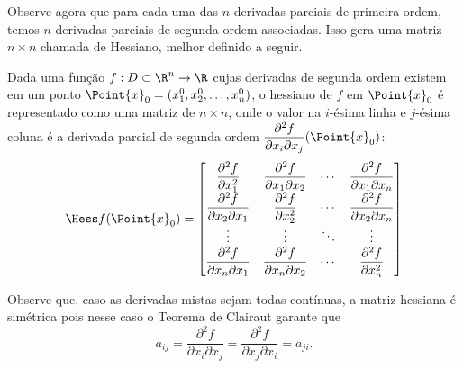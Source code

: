 \begin{comment}
Por outro lado, se $(x,y)\neq(0,0)$, então
$$\dfrac{\partial ^2 f}{\partial y \partial x}(x,y)= \dfrac{x^2 - y^2 - 4x^3y^4 + 4x^4y^2}{(x^2 + y^2)^2}.$$
Além disso, 
\begin{align*}
\dfrac{\partial^2 f}{\partial y \partial x}(0,0) 
&= 
\lim_{t \rightarrow 0} \dfrac{\dfrac{\partial f}{\partial x}(0,t)-\dfrac{\partial f}{\partial x}(0,0)}{t}\\[.5em]
&=
\lim_{t \rightarrow 0}
\dfrac{x^2 - y^2 - 4x^3y^4 + 4x^4y^2}{(x^2 + y^2)^2}
= -1.
\end{align*}
Da mesma forma,
$$
\dfrac{\partial f}{\partial y} = x\left(\dfrac{x^2-y^2}{x^2+y^2}-\dfrac{4 x^2 y^2}{\left(x^2+y^2\right)^2}\right)
$$
para $(x, y) \neq (0,0)$. Também,
$$
\dfrac{\partial f}{\partial y}(x, 0) = x \quad \text{ e } \quad \dfrac{\partial^2 f}{\partial x \partial y}(0,0) = 1.
$$
Portanto, para esta função,
$$
\dfrac{\partial^2 f}{\partial y \partial x}(0,0) = -1 \neq \dfrac{\partial^2 f}{\partial x \partial y}(0,0) = 1.
$$    
\end{example}
\end{comment}


Observe agora que para cada uma das $n$ derivadas parciais de primeira ordem, temos $n$ derivadas parciais de segunda ordem associadas. Isso gera uma matriz $n\times n$ chamada de Hessiano, melhor definido a seguir.
\begin{definition}{}{}
Dada uma função \(f:D \subset \R^n\to \R\) cujas derivadas de segunda ordem existem em um ponto $\Point{x}_0=(x_1^0,x_2^0,\dots,x_n^0)$, o hessiano de $f$ em $\Point{x}_0$ é representado como uma matriz %
de \(n \times n\), onde o valor na \(i\)-ésima linha e \(j\)-ésima coluna é a derivada parcial de segunda ordem \(\dfrac{\partial^2 f}{\partial x_i \partial x_j}(\Point{x}_0)\): 
\[\Hess f (\Point{x}_0) = \begin{bmatrix}
\dfrac{\partial^2 f}{\partial x_1^2} & \dfrac{\partial^2 f}{\partial x_1 \partial x_2} & \cdots & \dfrac{\partial^2 f}{\partial x_1 \partial x_n} \\
\dfrac{\partial^2 f}{\partial x_2 \partial x_1} & \dfrac{\partial^2 f}{\partial x_2^2} & \cdots & \dfrac{\partial^2 f}{\partial x_2 \partial x_n} \\
\vdots & \vdots & \ddots & \vdots \\
\dfrac{\partial^2 f}{\partial x_n \partial x_1} & \dfrac{\partial^2 f}{\partial x_n \partial x_2} & \cdots & \dfrac{\partial^2 f}{\partial x_n^2}
\end{bmatrix}\]
\end{definition}
Observe que, caso as derivadas mistas sejam todas contínuas, a matriz hessiana é simétrica pois nesse caso o Teorema de Clairaut garante que 
\[a_{ij}=\dfrac{\partial^2 f}{\partial x_i \partial x_j}=\dfrac{\partial^2 f}{\partial x_j \partial x_i}=a_{ji}.\]


